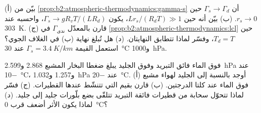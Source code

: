 \begin{exercise}[$\star\star\star$]\label{exo:b2:atmospheric-thermodynamics:11}
(أ) بيّن من \cref{prop:b2:atmospheric-thermodynamics:gamma-s} أن $\Gamma_s \to \Gamma_d$
حين $r_s \to 0$. (ب) بيّن أنه حين $Lr_s/(R_dT) \gg 1$، يكون $\Gamma_s \to gR_vT/(LR_d)$،
واحسبه عند \qty{303}{K}. (ج) قارن بالمعدّل $\Gamma_{\text{ندى}}$ في
\cref{prop:b2:atmospheric-thermodynamics:lcl} حين $T_d = T$، وفسّر لماذا تتطابق
النهايتان. (د) هل تُبلغ نهاية (ب) في الغلاف الجوي؟ استعمل القيمة $\Gamma_s =
\qty{3.4}{K/km}$ عند \qty{30}{\celsius} و\qty{1000}{hPa}.
\end{exercise}

\begin{exercise}[$\star\star\star$]\label{exo:b2:atmospheric-thermodynamics:12}
فوق الماء فائق التبريد وفوق الجليد يبلغ ضغطا البخار المشبع 2.868
و\qty{2.599}{hPa} عند \qty{-10}{\celsius}، و1.257 و\qty{1.032}{hPa} عند \qty{-20}{\celsius}.
(أ) أوجد  بالنسبة إلى الجليد لهواء مشبع فوق الماء عند كلتا الدرجتين. (ب)
قارن بقيم  التي تتنشّط عندها القطيرات. (ج) فسّر لماذا تتحوّل سحابة من
قطيرات فائقة التبريد تتلقّى بضع بلّورات جليد إلى جليد. (د) لماذا يكون الأثر
أضعف قرب \qty{0}{\celsius}؟
\end{exercise}

